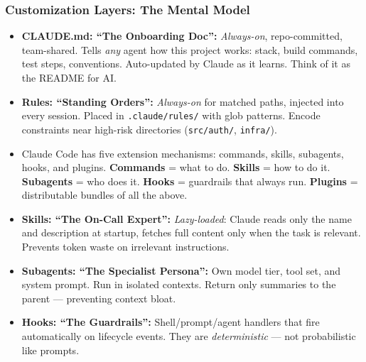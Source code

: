 
\begin{frame}[fragile]\frametitle{Customization Layers: The Mental Model}
  \begin{itemize}
    \item \textbf{CLAUDE.md: ``The Onboarding Doc'':} \textit{Always-on}, repo-committed, team-shared. Tells \textit{any} agent how this project works: stack, build commands, test steps, conventions. Auto-updated by Claude as it learns. Think of it as the README for AI.
    \item \textbf{Rules: ``Standing Orders'':} \textit{Always-on} for matched paths, injected into every session. Placed in \texttt{.claude/rules/} with glob patterns. Encode constraints near high-risk directories (\texttt{src/auth/}, \texttt{infra/}).
    \item Claude Code has five extension mechanisms: commands, skills, subagents, hooks, and plugins. \textbf{Commands} = what to do. \textbf{Skills} = how to do it. \textbf{Subagents} = who does it. \textbf{Hooks} = guardrails that always run. \textbf{Plugins} = distributable bundles of all the above.
    \item \textbf{Skills: ``The On-Call Expert'':} \textit{Lazy-loaded}: Claude reads only the name and description at startup, fetches full content only when the task is relevant. Prevents token waste on irrelevant instructions.
    \item \textbf{Subagents: ``The Specialist Persona'':} Own model tier, tool set, and system prompt. Run in isolated contexts. Return only summaries to the parent --- preventing context bloat.
    \item \textbf{Hooks: ``The Guardrails'':} Shell/prompt/agent handlers that fire automatically on lifecycle events. They are \textit{deterministic} --- not probabilistic like prompts.
  \end{itemize}
\end{frame}

